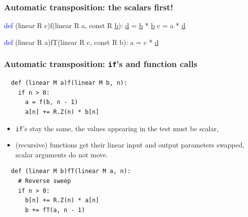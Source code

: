 \documentclass[10pt]{beamer}
\begin{document}

\begin{frame}[fragile]
  \frametitle{Automatic transposition: the scalars first!}

\begin{semiverbatim}
  \textcolor{blue}{def} (linear R c)f(linear R a, const R \underline{b}):
    \underline{d} = \underline{b} * \underline{b}
    c = a * \underline{d}
\end{semiverbatim}

\begin{block}{}
  \centering
\end{block}

\begin{semiverbatim}
  \textcolor{blue}{def} (linear R a)fT(linear R c, const R b):
    \alert<1>{a = c * \underline{d}}
\end{semiverbatim}

\end{frame}


\begin{frame}[fragile]
  \frametitle{Automatic transposition: \lstinline{if}'s and function calls}

\begin{lstlisting}
  def (linear M a)f(linear M b, n):
    if n > 0:
      a = f(b, n - 1)
      a[n] += R.Z(n) * b[n]
\end{lstlisting}

\begin{block}{}
  \begin{itemize}
  \item \lstinline{if}'s stay the same, the values appearing in the
    test \alert{must be scalar},
  \item (recursive) functions get their linear input and output
    parameters swapped, scalar arguments do not move.
  \end{itemize}
\end{block}

\begin{lstlisting}
  def (linear M b)fT(linear M a, n):
    # Reverse sweep
    if n > 0:
      b[n] += R.Z(n) * a[n]
      b += fT(a, n - 1)
\end{lstlisting}
  
\end{frame}
\end{document}
